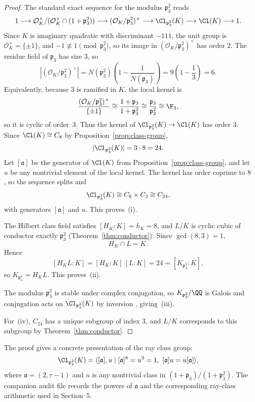 \begin{proof}
The standard exact sequence for the modulus \(\mathfrak p_3^2\) reads \cite[Ch.~VI]{Neukirch1999}
\[
1\longrightarrow \mathcal O_K^\times/(\mathcal O_K^\times\cap (1+\mathfrak p_3^2))
\longrightarrow (\mathcal O_K/\mathfrak p_3^2)^\times
\longrightarrow \Cl_{\mathfrak p_3^2}(K)
\longrightarrow \Cl(K)\longrightarrow 1.
\]
Since \(K\) is imaginary quadratic with discriminant \(-111\), the unit group is \(\mathcal O_K^\times=\{\pm 1\}\), and \(-1\not\equiv 1\pmod{\mathfrak p_3^2}\), so its image in \((\mathcal O_K/\mathfrak p_3^2)^\times\) has order \(2\). The residue field of \(\mathfrak p_3\) has size \(3\), so
\[
|(\mathcal O_K/\mathfrak p_3^2)^\times|
=N(\mathfrak p_3^2)\left(1-\frac{1}{N(\mathfrak p_3)}\right)
=9\left(1-\frac13\right)
=6.
\]
Equivalently, because \(3\) is ramified in \(K\), the local kernel is
\[
\frac{(\mathcal O_K/\mathfrak p_3^2)^\times}{\{\pm1\}}
\cong \frac{1+\mathfrak p_3}{1+\mathfrak p_3^2}
\cong \frac{\mathfrak p_3}{\mathfrak p_3^2}
\cong \F_3,
\]
so it is cyclic of order~\(3\). Thus the kernel of \(\Cl_{\mathfrak p_3^2}(K)\to \Cl(K)\) has order \(3\). Since \(\Cl(K)\cong C_8\) by Proposition~\ref{prop:class-group},
\[
|\Cl_{\mathfrak p_3^2}(K)|=3\cdot 8=24.
\]
Let \([\mathfrak a]\) be the generator of \(\Cl(K)\) from Proposition~\ref{prop:class-group}, and let \(u\) be any nontrivial element of the local kernel. The kernel has order coprime to \(8\), so the sequence splits and
\[
\Cl_{\mathfrak p_3^2}(K)\cong C_8\times C_3\cong C_{24},
\]
with generators \([\mathfrak a]\) and \(u\). This proves~(i).

The Hilbert class field satisfies \([H_K:K]=h_K=8\), and \(L/K\) is cyclic cubic of conductor exactly \(\mathfrak p_3^2\) (Theorem~\ref{thm:conductor}). Since \(\gcd(8,3)=1\),
\[
H_K\cap L=K.
\]
Hence
\[
[H_KL:K]=[H_K:K]\,[L:K]=24=[K_{\mathfrak p_3^2}:K],
\]
so \(K_{\mathfrak p_3^2}=H_KL\). This proves~(ii).

The modulus \(\mathfrak p_3^2\) is stable under complex conjugation, so \(K_{\mathfrak p_3^2}/\QQ\) is Galois and conjugation acts on \(\Cl_{\mathfrak p_3^2}(K)\) by inversion \cite[Ch.~9]{Cox2012}, giving~(iii).

For~(iv), \(C_{24}\) has a unique subgroup of index \(3\), and \(L/K\) corresponds to this subgroup by Theorem~\ref{thm:conductor}.
\end{proof}

\begin{remark}\label{rem:ray-class-explicit}
The proof gives a concrete presentation of the ray class group:
\[
\Cl_{\mathfrak p_3^2}(K)=\langle [\mathfrak a],u \mid [\mathfrak a]^8=u^3=1,\ [\mathfrak a]u=u[\mathfrak a]\rangle,
\]
where \(\mathfrak a=(2,\tau-1)\) and \(u\) is any nontrivial class in \((1+\mathfrak p_3)/(1+\mathfrak p_3^2)\). The companion audit file records the powers of \(\mathfrak a\) and the corresponding ray-class arithmetic used in Section~5.
\end{remark}

